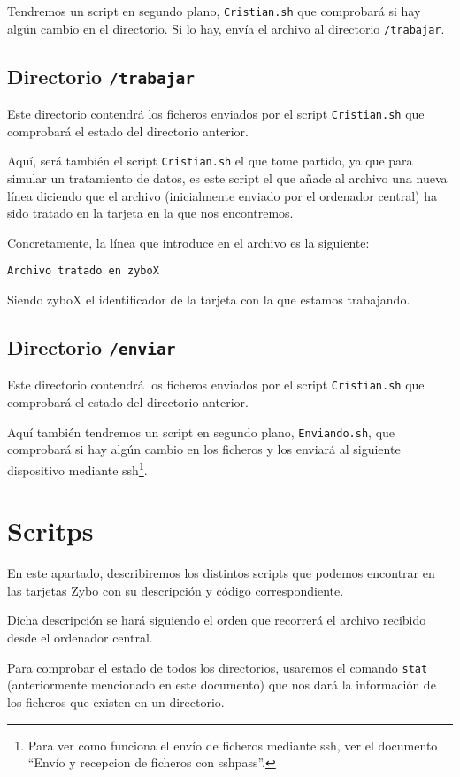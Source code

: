 \documentclass[12pt,letterpaper]{article}
\begin{document}
Tendremos un script en segundo plano, \texttt{Cristian.sh} que comprobará si hay algún cambio en el directorio. Si lo hay, envía el archivo al directorio \texttt{/trabajar}.

\subsection{Directorio \texttt{/trabajar}}
Este directorio contendrá los ficheros enviados por el script \texttt{Cristian.sh} que comprobará el estado del directorio anterior.

Aquí, será también el script \texttt{Cristian.sh} el que tome partido, ya que para simular un tratamiento de datos, es este script el que añade al archivo una nueva línea diciendo que el archivo (inicialmente enviado por el ordenador central) ha sido tratado en la tarjeta en la que nos encontremos.

Concretamente, la línea que introduce en el archivo es la siguiente:\label{aqui}
\begin{center}
	\texttt{Archivo tratado en zyboX}
\end{center}

Siendo zyboX el identificador de la tarjeta con la que estamos trabajando.

\subsection{Directorio \texttt{/enviar}}
Este directorio contendrá los ficheros enviados por el script \texttt{Cristian.sh} que comprobará el estado del directorio anterior.

Aquí también tendremos un script en segundo plano, \texttt{Enviando.sh}, que comprobará si hay algún cambio en los ficheros y los enviará al siguiente dispositivo mediante ssh\footnote{Para ver como funciona el envío de ficheros mediante ssh, ver el documento ``Envío y recepcion de ficheros con sshpass''.}.


\section{Scritps}
En este apartado, describiremos los distintos scripts que podemos encontrar en las tarjetas Zybo con su descripción y código correspondiente.

Dicha descripción se hará siguiendo el orden que recorrerá el archivo recibido desde el ordenador central.

Para comprobar el estado de todos los directorios, usaremos el comando \texttt{stat} (anteriormente mencionado en este documento) que nos dará la información de los ficheros que existen en un directorio.
\end{document}

